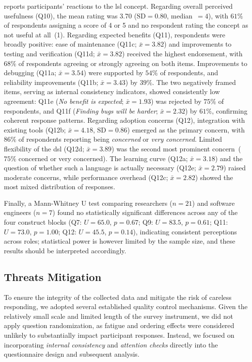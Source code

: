 \documentclass[manuscript,screen]{acmart}
\begin{document}
 reports participants' reactions to the \ac{lsl} concept.
Regarding overall perceived usefulness (Q10), the mean rating was 3.70 ($\mathrm{SD} = 0.80$, median~$= 4$), with $61\%$ of respondents assigning a score of 4 or 5 and no respondent rating the concept as not useful at all~(1).
Regarding expected benefits (Q11), respondents were broadly positive: ease of maintenance (Q11c; $\bar{x} = 3.82$) and improvements to testing and verification (Q11d; $\bar{x} = 3.82$) received the highest endorsement, with $68\%$ of respondents agreeing or strongly agreeing on both items.
Improvements to debugging (Q11a; $\bar{x} = 3.54$) were supported by $54\%$ of respondents, and reliability improvements (Q11b; $\bar{x} = 3.43$) by $39\%$.
The two negatively framed items, serving as internal consistency indicators, showed consistently low agreement: Q11e (\emph{No benefit is expected}; $\bar{x} = 1.93$) was rejected by $75\%$ of respondents, and Q11f (\emph{Finding bugs will be harder}; $\bar{x} = 2.32$) by $61\%$, confirming coherent response patterns.
Regarding adoption concerns (Q12), integration with existing tools (Q12b; $\bar{x} = 4.18$, $\mathrm{SD} = 0.86$) emerged as the primary concern, with $86\%$ of respondents reporting being \emph{concerned} or \emph{very concerned}.
Limited flexibility of the \ac{dsl} (Q12d; $\bar{x} = 3.89$) was the second most prominent concern~($75\%$ concerned or very concerned).
The learning curve (Q12a; $\bar{x} = 3.18$) and the question of whether such a language is actually necessary (Q12e; $\bar{x} = 2.79$) raised moderate concerns, while performance overhead (Q12c; $\bar{x} = 2.82$) showed the most mixed distribution of responses.

Finally, a Mann-Whitney U test comparing researchers ($n = 21$) and software engineers ($n = 7$) found no statistically significant differences across any of the four construct blocks (Q7: $U = 65.0$, $p = 0.67$; Q9: $U = 83.5$, $p = 0.61$; Q11: $U = 73.0$, $p = 1.00$; Q12: $U = 45.5$, $p = 0.14$), indicating consistent perceptions across roles; statistical power is however limited by the sample size, and these results should be interpreted accordingly.

\subsection{Threats Mitigation}
\label{sec:threats-mitigation}

To ensure the integrity of the collected data and mitigate the risk of careless responding, we adopted several established quality control mechanisms. 
Given the relatively small scale and limited length of the survey instrument, we did not apply question randomization, as fatigue and ordering effects were considered unlikely to substantially impact participant responses. 
Instead, we focused on incorporating \emph{internal consistency} and \emph{attention checks} directly into the questionnaire design and subsequent analysis.
\end{document}
